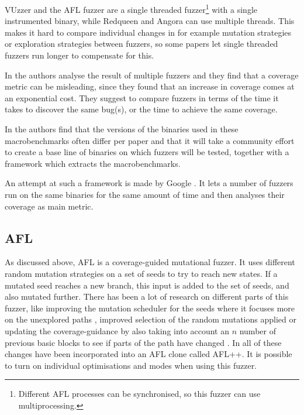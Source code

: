 VUzzer\cite{rawat2017vuzzer} and the AFL fuzzer \cite{aflfuzzer} are a single threaded fuzzer\footnote{Different AFL processes can be synchronised, so this fuzzer can use multiprocessing.} with a single instrumented binary, while Redqueen \cite{aschermann2019redqueen} and Angora \cite{chen2018angora} can use multiple threads. This makes it hard to compare individual changes in for example mutation strategies or exploration strategies between fuzzers, so some papers let single threaded fuzzers run longer \cite{chen2020meuzz} to compensate for this. 

In \cite{bohmefuzzing} the authors analyse the result of multiple fuzzers and they find that a coverage metric can be misleading, since they found that an increase in coverage comes at an exponential cost. They suggest to compare fuzzers in terms of the time it takes to discover the same bug(s), or the time to achieve the same coverage. 

In \cite{klees2018evaluating} the authors find that the versions of the binaries used in these macrobenchmarks often differ per paper and that it will take a community effort to create a base line of binaries on which fuzzers will be tested, together with a framework which extracts the macrobenchmarks.

An attempt at such a framework is made by Google \cite{metzman2020fuzzbench}. It lets a number of fuzzers run on the same binaries for the same amount of time and then analyses their coverage as main metric.

\subsection{AFL}
As discussed above, AFL is a coverage-guided mutational fuzzer. It uses different random mutation strategies on a set of seeds to try to reach new states. If a mutated seed reaches a new branch, this input is added to the set of seeds, and also mutated further. There has been a lot of research on different parts of this fuzzer, like improving the mutation scheduler for the seeds where it focuses more on the unexplored paths \cite{bohme2017coverage}, improved selection of the random mutations applied \cite{lyu2019mopt} or updating the coverage-guidance by also taking into account an $n$ number of previous basic blocks to see if parts of the path have changed \cite{wang2019sensitive}. In \cite{fioraldi2020afl++} all of these changes have been incorporated into an AFL clone called AFL++. It is possible to turn on individual optimisations and modes when using this fuzzer.

